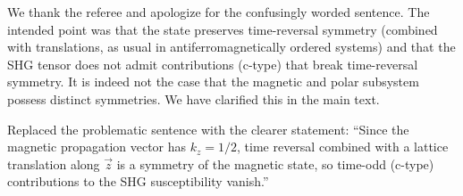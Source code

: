 We thank the referee and apologize for the confusingly worded sentence.
The intended point was that the state preserves time-reversal symmetry (combined with translations, as usual in antiferromagnetically ordered systems) and that the SHG tensor does not admit contributions (c-type) that break time-reversal symmetry.
It is indeed not the case that the magnetic and polar subsystem possess distinct symmetries. 
We have clarified this in the main text.

\begin{changesmade}
Replaced the problematic sentence with the clearer statement: ``Since the magnetic propagation vector has $k_z = 1/2$, time reversal combined with a lattice translation along $\vec{z}$ is a symmetry of the magnetic state, so time-odd (c-type) contributions to the SHG susceptibility vanish.''
\end{changesmade}
